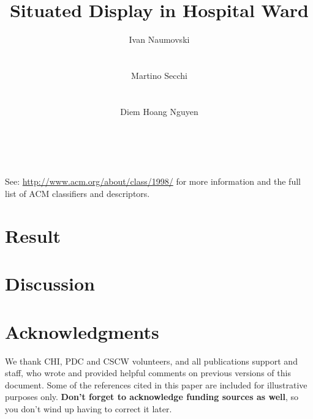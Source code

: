 \documentclass{sigchi}
\begin{document}
\title{Situated Display in Hospital Ward}

\author{
  \alignauthor Ivan Naumovski\\
    \\
    \\
  \alignauthor Martino Secchi\\
    \\
    \\
  \alignauthor Diem Hoang Nguyen\\
    \\
    \\
}

\maketitle

\begin{abstract}

\end{abstract}



See: \url{http://www.acm.org/about/class/1998/}
for more information and the full list of ACM classifiers
and descriptors. 







\section{Result}


\section{Discussion}


\section{Acknowledgments}
We thank CHI, PDC and CSCW volunteers, and all publications support
and staff, who wrote and provided helpful comments on previous
versions of this document.  Some of the references cited in this paper
are included for illustrative purposes only.  \textbf{Don't forget
to acknowledge funding sources as well}, so you don't wind up
having to correct it later.
\end{document}
